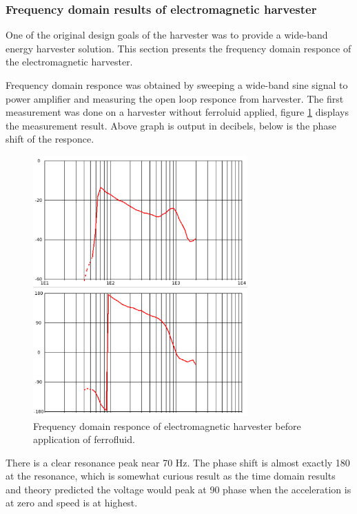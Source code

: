 \subsubsection{Frequency domain results of electromagnetic harvester}
One of the original design goals of the harvester was to provide a wide-band energy harvester solution. This section presents the frequency domain responce of the electromagnetic harvester.

Frequency domain responce was obtained by sweeping a wide-band sine signal to power amplifier and measuring the open loop responce from harvester. The first measurement was done on a harvester without ferroluid applied, figure \ref{fig:inductive_fd_dry} displays the measurement result. Above graph is output in decibels, below is the phase shift of the responce.

\begin{figure}[htb]
\begin{center}
\includegraphics[height=10cm]{images/own_measurement/generator_shaker/inductive_fd_dry.png}
\end{center}
\caption{\label{fig:inductive_fd_dry} Frequency domain responce of electromagnetic harvester before application of ferrofluid.}
\end{figure}

There is a clear resonance peak near 70 Hz. The phase shift is almost exactly 180 \degree at the resonance, which is somewhat curious result as the time domain results and theory predicted the voltage would peak at 90 \degree phase when the acceleration is at zero and speed is at highest. 

